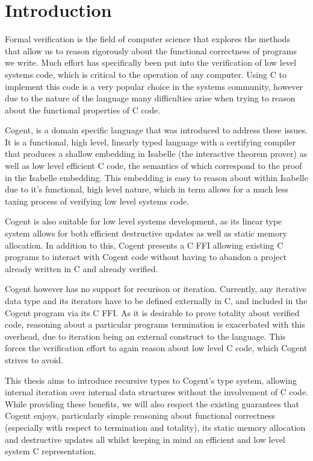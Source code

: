 \chapter{Introduction}\label{ch:intro}


Formal verification is the field of computer science that explores the methods that allow us to
  reason rigorously about the functional correctness of programs we write. 
Much effort has specifically been put into the verification of low level systems code,
  which is critical to the operation of any computer.
Using C to implement this code is a very popular choice in the systems community,
  however due to the nature of the language many difficulties arise when trying to
  reason about the functional properties of C code.

Cogent\cite{OCo16}, is a domain specific language that was introduced to address these issues.
It is a functional, high level, linearly typed language with a certifying compiler
  that produces a shallow embedding in Isabelle (the interactive theorem prover) as well as low level efficient C code,
  the semantics of which correspond to the proof in the Isabelle embedding.
This embedding is easy to reason about within Isabelle due to it's functional,
  high level nature, which in term allows for a much less taxing process of verifying low level systems code. 

Cogent is also suitable for low level systems development,
  as its linear type system allows for both efficient destructive updates as well as static memory allocation.
In addition to this, Cogent presents a C FFI allowing existing C programs to interact with Cogent code without having to
  abandon a project already written in C and already verified.

Cogent however has no support for recurison or iteration. 
Currently, any iterative data type and its iterators have to be defined externally in C,
  and included in the Cogent program via its C FFI.
As it is desirable to prove totality about verified code,
  reasoning about a particular programs termination is exacerbated with this overhead,
  due to iteration being an external construct to the language.
This forces the verification effort to again reason about low level C code, which Cogent strives to avoid.

This thesis aims to introduce recursive types to Cogent's type system, allowing internal iteration over
  internal data structures without the involvement of C code.
While providing these benefits, we will also respect the existing guarantees that Cogent enjoys,
  particularly simple reasoning about functional correctness (especially with respect to termination and totality),
  its static memory allocation and destructive updates all whilst keeping in mind
  an efficient and low level system C representation.